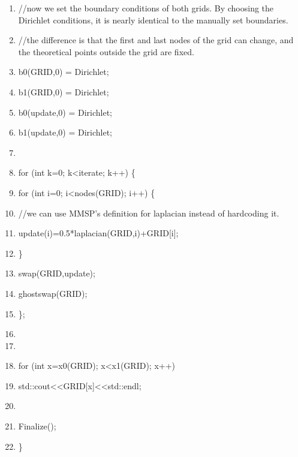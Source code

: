 \documentclass{article}
\begin{document}
\begin{shadebox}
\begin{enumerate} \itemsep1pt \parskip0pt 
\setcounter{enumi}{30}
\item //now we set the boundary conditions of both grids.  By choosing the Dirichlet conditions, it is nearly identical to the manually set boundaries.  
\item //the difference is that the first and last nodes of the grid can change, and the theoretical points outside the grid are fixed.
\item b0(GRID,0) = Dirichlet;
\item b1(GRID,0) = Dirichlet;
\item b0(update,0) = Dirichlet;
\item b1(update,0) = Dirichlet;
\item 

\item for (int k=0; k\textless iterate; k++) \{
\item \hspace{10pt}         for (int i=0; i\textless nodes(GRID); i++) \{
\item //we can use MMSP's definition for laplacian instead of hardcoding it.
\item \hspace{10pt} \hspace{10pt}              update(i)=0.5*laplacian(GRID,i)+GRID[i];
\item \hspace{10pt}         \}
\item \hspace{10pt}         swap(GRID,update);
\item \hspace{10pt}         ghostswap(GRID);
\item \};
\item 
\item 
\item for (int x=x0(GRID); x\textless x1(GRID); x++)
\item \hspace{10pt}         std::cout\textless \textless GRID[x]\textless \textless std::endl;
\item 
\item Finalize();
\item \}
\end{enumerate}
\end{shadebox}
\end{document}
